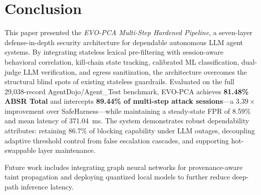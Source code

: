 \documentclass[conference]{IEEEtran}
\begin{document}
\section{Conclusion}
This paper presented the \textit{EVO-PCA Multi-Step Hardened Pipeline}, a seven-layer defense-in-depth security architecture for dependable autonomous LLM agent systems. By integrating stateless lexical pre-filtering with session-aware behavioral correlation, kill-chain state tracking, calibrated ML classification, dual-judge LLM verification, and egress sanitization, the architecture overcomes the structural blind spots of existing stateless guardrails. Evaluated on the full 29,038-record AgentDojo/Agent\_Test benchmark, EVO-PCA achieves \textbf{81.48\% ABSR Total} and intercepts \textbf{89.44\% of multi-step attack sessions}---a $3.39\times$ improvement over SafeHarness---while maintaining a steady-state FPR of 8.59\% and mean latency of 371.04~ms. The system demonstrates robust dependability attributes: retaining 86.7\% of blocking capability under LLM outages, decoupling adaptive threshold control from false escalation cascades, and supporting hot-swappable layer maintenance.

Future work includes integrating graph neural networks for provenance-aware taint propagation and deploying quantized local models to further reduce deep-path inference latency.
\end{document}
